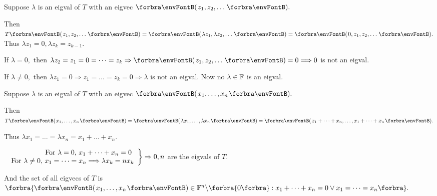 \documentclass[a4paper, 11pt, UTF8]{article}
\begin{document}
\begin{large}
Suppose $\lambda$ is an eigval of $T$ with an eigvec $\Par{z_1,z_2,\dots}.$\par
\Blind{\Solution} Then $T\Par{z_1,z_2,\dots}=\Par{\lambda z_1,\lambda z_2,\dots}=\Par{0,z_1,z_2,\dots}.$ Thus $\lambda z_1=0,\lambda z_k=z_{k-1}.$\par
\Blind{\Solution} If $\lambda=0,$ then $\lambda z_2=z_1=0=\dots=z_k\Rightarrow\Par{z_1,z_2,\dots}=0\Longrightarrow0$ is not an eigval.\par
\Blind{\Solution} If $\lambda\neq 0,$ then $\lambda z_1=0\Rightarrow z_1=\dots=z_k=0\Longrightarrow\lambda$ is not an eigval. Now no $\lambda\in{\mathbb{F}}$ is an eigval.\PfEnd
\SepLine

\par\quad
Suppose $\lambda$ is an eigval of $T$ with an eigvec $\Par{x_1,\dots,x_n}.$\par\quad
Then $T\Par{x_1,\dots,x_n}=\Par{\lambda x_1,\dots,\lambda x_n}=\Par{x_1+\dots+x_n,\dots,x_1+\dots+x_n}.$\par\quad
Thus $\lambda x_1=\dots=\lambda x_n=x_1+\dots+x_n.$\par\quad
$\hMath[0pt]{r}{\left.}{\right\}}{$
	For $\lambda=0,$ $x_1+\dots+x_n=0$ $\\$
	For $\lambda\neq 0,$ $x_1=\dots=x_n\Longrightarrow\lambda x_k=n x_k}\Rightarrow0,n$ are the eigvals of $T.$\par\quad
And the set of all eigvecs of $T$ is $\Bra{\Par{x_1,\dots,x_n}\in\Fbb^n\backslash\zeroSubs:x_1+\dots+x_n=0\vee x_1=\dots=x_n}.$\PfEnd
\SepLine


\end{large}
\end{document}
